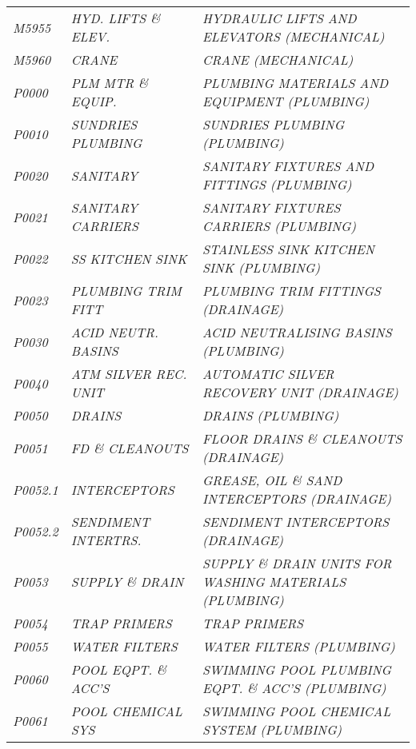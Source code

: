 \begin{landscape}
\begin{longtable}[l]{l%
                  l|%
                  l|}
\itshape M5955       &\itshape HYD. LIFTS \& ELEV.   &\itshape HYDRAULIC LIFTS AND ELEVATORS (MECHANICAL)   \\
\itshape M5960       &\itshape CRANE   &\itshape CRANE (MECHANICAL)   \\
\itshape P0000       &\itshape PLM MTR \& EQUIP.   &\itshape PLUMBING MATERIALS AND EQUIPMENT (PLUMBING)   \\
\itshape P0010       &\itshape SUNDRIES PLUMBING   &\itshape SUNDRIES PLUMBING (PLUMBING)   \\
\itshape P0020       &\itshape SANITARY   &\itshape SANITARY FIXTURES AND FITTINGS (PLUMBING)   \\
\itshape P0021       &\itshape SANITARY CARRIERS   &\itshape SANITARY FIXTURES CARRIERS (PLUMBING)   \\
\itshape P0022       &\itshape SS KITCHEN SINK   &\itshape STAINLESS SINK KITCHEN SINK (PLUMBING)   \\
\itshape P0023       &\itshape PLUMBING TRIM FITT   &\itshape PLUMBING TRIM FITTINGS (DRAINAGE)   \\
\itshape P0030       &\itshape ACID NEUTR. BASINS   &\itshape ACID NEUTRALISING BASINS (PLUMBING)   \\
\itshape P0040       &\itshape ATM SILVER REC. UNIT   &\itshape AUTOMATIC SILVER RECOVERY UNIT (DRAINAGE)   \\
\itshape P0050       &\itshape DRAINS   &\itshape DRAINS (PLUMBING)   \\
\itshape P0051       &\itshape FD \& CLEANOUTS   &\itshape FLOOR DRAINS \& CLEANOUTS (DRAINAGE)   \\
\itshape P0052.1     &\itshape INTERCEPTORS   &\itshape GREASE, OIL \& SAND INTERCEPTORS (DRAINAGE)   \\
\itshape P0052.2     &\itshape SENDIMENT INTERTRS.   &\itshape SENDIMENT INTERCEPTORS (DRAINAGE)   \\
\itshape P0053       &\itshape SUPPLY \& DRAIN   &\itshape SUPPLY \& DRAIN UNITS FOR WASHING MATERIALS (PLUMBING)   \\
\itshape P0054       &\itshape TRAP PRIMERS   &\itshape TRAP PRIMERS   \\
\itshape P0055       &\itshape WATER FILTERS   &\itshape WATER FILTERS (PLUMBING)   \\
\itshape P0060       &\itshape POOL EQPT. \& ACC'S   &\itshape SWIMMING POOL PLUMBING EQPT. \& ACC'S (PLUMBING)   \\
\itshape P0061       &\itshape POOL CHEMICAL SYS   &\itshape SWIMMING POOL CHEMICAL SYSTEM (PLUMBING)   \\

\end{longtable}
\end{landscape}
